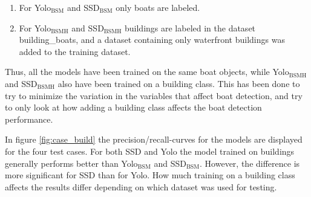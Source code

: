 \vspace{1mm}

\begin{enumerate}
    \item For Yolo$_{\text{BSM}}$ and SSD$_{\text{BSM}}$ only boats are labeled.
    \item For Yolo$_{\text{BSMH}}$ and SSD$_{\text{BSMH}}$ buildings are labeled in the dataset building\_boats, and a dataset containing only waterfront buildings was added to the training dataset.
\end{enumerate}

\vspace{1mm}

Thus, all the models have been trained on the same boat objects, while Yolo$_{\text{BSMH}}$ and SSD$_{\text{BSMH}}$ also have been trained on a building class. This has been done to try to minimize the variation in the variables that affect boat detection, and try to only look at how adding a building class affects the boat detection performance.

\vspace{3mm}

In figure \ref{fig:case_build} the precision/recall-curves for the models are displayed for the four test cases. For both SSD and Yolo the model trained on buildings generally performs better than Yolo$_{\text{BSM}}$ and SSD$_{\text{BSM}}$. However, the difference is more significant for SSD than for Yolo. How much training on a building class affects the results differ depending on which dataset was used for testing. 

